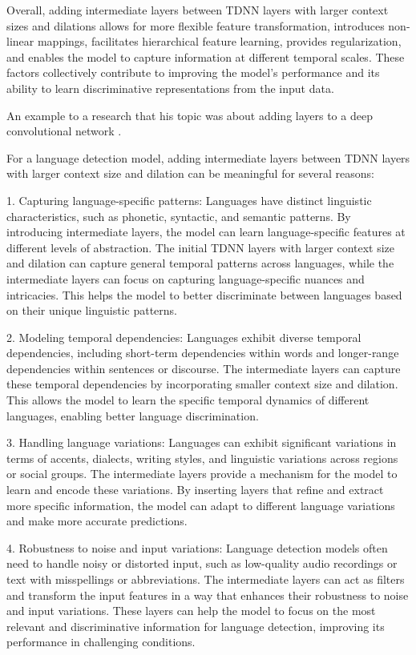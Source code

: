\documentclass[a4paper]{article}
\begin{document}
Overall, adding intermediate layers between TDNN layers with larger context sizes and dilations allows for more flexible feature transformation, introduces non-linear mappings, facilitates hierarchical feature learning, provides regularization, and enables the model to capture information at different temporal scales. These factors collectively contribute to improving the model's performance and its ability to learn discriminative representations from the input data.

An example to a research that his topic was about adding layers to a deep convolutional network \cite{donahue2014decaf}.

For a language detection model, adding intermediate layers between TDNN layers with larger context size and dilation can be meaningful for several reasons:

1. Capturing language-specific patterns: Languages have distinct linguistic characteristics, such as phonetic, syntactic, and semantic patterns. By introducing intermediate layers, the model can learn language-specific features at different levels of abstraction. The initial TDNN layers with larger context size and dilation can capture general temporal patterns across languages, while the intermediate layers can focus on capturing language-specific nuances and intricacies. This helps the model to better discriminate between languages based on their unique linguistic patterns.

2. Modeling temporal dependencies: Languages exhibit diverse temporal dependencies, including short-term dependencies within words and longer-range dependencies within sentences or discourse. The intermediate layers can capture these temporal dependencies by incorporating smaller context size and dilation. This allows the model to learn the specific temporal dynamics of different languages, enabling better language discrimination.

3. Handling language variations: Languages can exhibit significant variations in terms of accents, dialects, writing styles, and linguistic variations across regions or social groups. The intermediate layers provide a mechanism for the model to learn and encode these variations. By inserting layers that refine and extract more specific information, the model can adapt to different language variations and make more accurate predictions.

4. Robustness to noise and input variations: Language detection models often need to handle noisy or distorted input, such as low-quality audio recordings or text with misspellings or abbreviations. The intermediate layers can act as filters and transform the input features in a way that enhances their robustness to noise and input variations. These layers can help the model to focus on the most relevant and discriminative information for language detection, improving its performance in challenging conditions.
\end{document}
